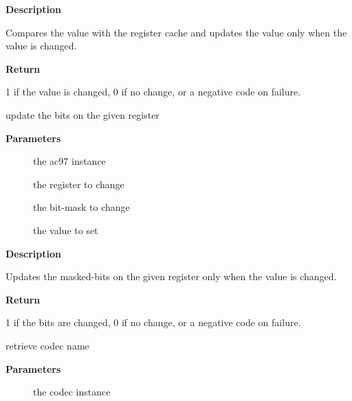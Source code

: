 \documentclass[a4paper,8pt,english]{sphinxmanual}
\begin{document}
\textbf{Description}

Compares the value with the register cache and updates the value
only when the value is changed.

\textbf{Return}

1 if the value is changed, 0 if no change, or a negative
code on failure.

\begin{fulllineitems}
\label{sound/kernel-api/alsa-driver-api:c.snd_ac97_update_bits}
update the bits on the given register

\end{fulllineitems}


\textbf{Parameters}
\begin{description}
\item[{}] \leavevmode
the ac97 instance

\item[{}] \leavevmode
the register to change

\item[{}] \leavevmode
the bit-mask to change

\item[{}] \leavevmode
the value to set

\end{description}

\textbf{Description}

Updates the masked-bits on the given register only when the value
is changed.

\textbf{Return}

1 if the bits are changed, 0 if no change, or a negative
code on failure.

\begin{fulllineitems}
\label{sound/kernel-api/alsa-driver-api:c.snd_ac97_get_short_name}
retrieve codec name

\end{fulllineitems}


\textbf{Parameters}
\begin{description}
\item[{}] \leavevmode
the codec instance

\end{description}
\end{document}
